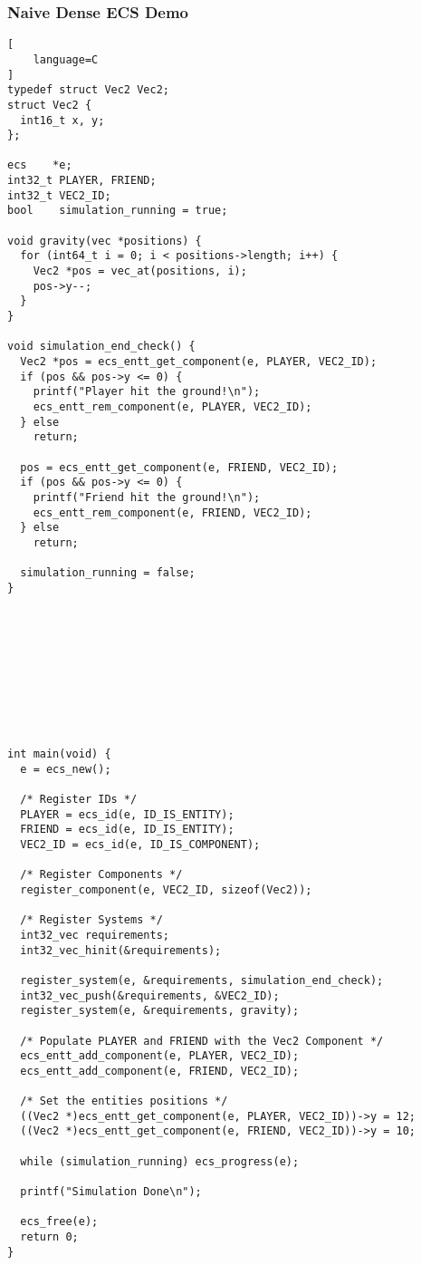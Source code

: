 \subsubsection{Naive Dense ECS Demo}
\begin{lstlisting}[
    language=C
]
typedef struct Vec2 Vec2;
struct Vec2 {
  int16_t x, y;
};

ecs    *e;
int32_t PLAYER, FRIEND;
int32_t VEC2_ID;
bool    simulation_running = true;

void gravity(vec *positions) {
  for (int64_t i = 0; i < positions->length; i++) {
    Vec2 *pos = vec_at(positions, i);
    pos->y--;
  }
}

void simulation_end_check() {
  Vec2 *pos = ecs_entt_get_component(e, PLAYER, VEC2_ID);
  if (pos && pos->y <= 0) {
    printf("Player hit the ground!\n");
    ecs_entt_rem_component(e, PLAYER, VEC2_ID);
  } else
    return;

  pos = ecs_entt_get_component(e, FRIEND, VEC2_ID);
  if (pos && pos->y <= 0) {
    printf("Friend hit the ground!\n");
    ecs_entt_rem_component(e, FRIEND, VEC2_ID);
  } else
    return;

  simulation_running = false;
}










int main(void) {
  e = ecs_new();

  /* Register IDs */
  PLAYER = ecs_id(e, ID_IS_ENTITY);
  FRIEND = ecs_id(e, ID_IS_ENTITY);
  VEC2_ID = ecs_id(e, ID_IS_COMPONENT);

  /* Register Components */
  register_component(e, VEC2_ID, sizeof(Vec2));

  /* Register Systems */
  int32_vec requirements;
  int32_vec_hinit(&requirements);

  register_system(e, &requirements, simulation_end_check);
  int32_vec_push(&requirements, &VEC2_ID);
  register_system(e, &requirements, gravity);

  /* Populate PLAYER and FRIEND with the Vec2 Component */
  ecs_entt_add_component(e, PLAYER, VEC2_ID);
  ecs_entt_add_component(e, FRIEND, VEC2_ID);

  /* Set the entities positions */
  ((Vec2 *)ecs_entt_get_component(e, PLAYER, VEC2_ID))->y = 12;
  ((Vec2 *)ecs_entt_get_component(e, FRIEND, VEC2_ID))->y = 10;

  while (simulation_running) ecs_progress(e);

  printf("Simulation Done\n");

  ecs_free(e);
  return 0;
}
\end{lstlisting}